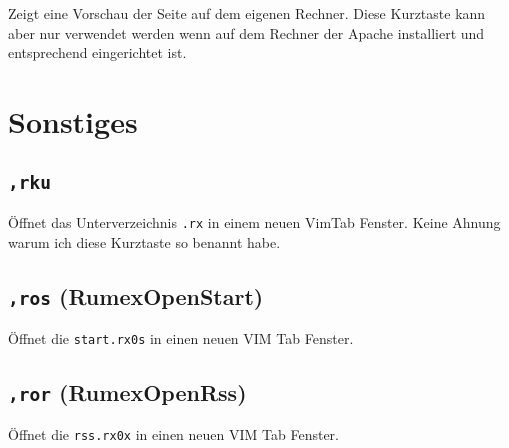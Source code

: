 Zeigt eine Vorschau der Seite auf dem eigenen Rechner. Diese Kurztaste
kann aber nur verwendet werden wenn auf dem Rechner der Apache
installiert und entsprechend eingerichtet ist.

\section{Sonstiges}\label{sonstiges}

\subsection{\texttt{,rku}}\label{rku}

Öffnet das Unterverzeichnis \texttt{.rx} in einem neuen VimTab Fenster.
Keine Ahnung warum ich diese Kurztaste so benannt habe.

\subsection{\texttt{,ros} (RumexOpenStart)}\label{ros-rumexopenstart}

Öffnet die \texttt{start.rx0s} in einen neuen VIM Tab Fenster.

\subsection{\texttt{,ror} (RumexOpenRss)}\label{ror-rumexopenrss}

Öffnet die \texttt{rss.rx0x} in einen neuen VIM Tab Fenster.
